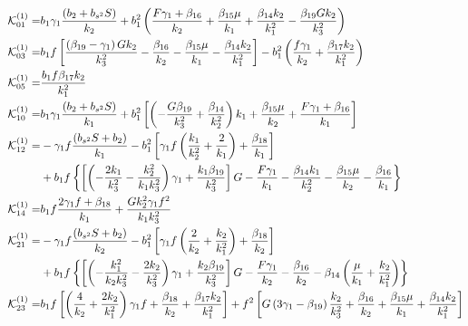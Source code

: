 \begin{align}
\ko^{(1)}_{01}=&
 b_{1}\gamma_{1}\frac{\left( b_{2}+b_{s^2} S \right)}{k_{2}}
+ b_{1}^{2}
\left(\frac{F \gamma_{1}+\beta_{16}}{k_{2}}+\frac{\beta_{15} \mu}{k_{1}}+\frac{\beta_{14}k_{2} }{k_{1}^{2}}-\frac{  \beta_{19}G k_{2}}{k_{3}^{2}}\right)
%
 \\ \ko^{(1)}_{03}=& b_{1}f\left[\frac{\left(\beta_{19}-\gamma_{1}\right) G k_{2}}{k_{3}^{2}}-\frac{\beta_{16}}{k_{2}}-\frac{\beta_{15} \mu}{k_{1}}-\frac{\beta_{14} k_{2} }{k_{1}^{2}}\right] 
 -b_{1}^{2}\left(\frac{f \gamma_{1}}{k_{2}}+\frac{ \beta_{17}k_{2}}{k_{1}^{2}}\right) 
 \\ \ko^{(1)}_{05}=&  \frac{b_{1}f \beta_{17}k_{2} }{k_{1}^{2}}
 \\ \ko^{(1)}_{10}=& b_{1}\gamma_{1}\frac{\left(b_{2}+b_{s^2} S \right)}{k_{1}}+  b_{1}^{2}\left[\left(-\frac{G \beta_{19}}{k_{3}^{2}}+\frac{\beta_{14}}{k_{2}^{2}}\right) k_{1}+\frac{\beta_{15} \mu}{k_{2}}+\frac{F \gamma_{1}+\beta_{16}}{k_{1}}\right]
 \\ \ko^{(1)}_{12}=&  - \gamma_{1} f\frac{\left(b_{s^2} S+b_{2}\right)}{k_{1}}-  b_{1}^{2}\left[\gamma_{1} f\left(\frac{k_{1}}{k_{2}^{2}}+\frac{2}{k_{1}}\right) +\frac{\beta_{18}}{k_{1}}\right]\\&
 + b_{1}f\left\{\left[\left(-\frac{2 k_{1}}{k_{3}^{2}}-\frac{k_{2}^{2}}{k_{1} k_{3}^{2}}\right) \gamma_{1}+\frac{k_{1} \beta_{19}}{k_{3}^{2}}\right] G-\frac{F \gamma_{1}}{k_{1}}-\frac{\beta_{14} k_{1}}{k_{2}^{2}}-\frac{\beta_{15} \mu}{k_{2}}-\frac{\beta_{16}}{k_{1}}\right\}
 \\ \ko^{(1)}_{14}=&  b_{1}f\frac{2 \gamma_{1} f+\beta_{18}}{k_{1}}+\frac{G k_{2}^{2} \gamma_{1} f^{2}}{k_{1} k_{3}^{2}}
 \\ \ko^{(1)}_{21}=& -\gamma_{1} f\frac{\left(b_{s^2} S+ b_{2}\right)}{k_{2}}
  -b_{1}^{2}\left[\gamma_1 f\left(\frac{2}{k_{2}}+\frac{k_{2}}{k_{1}^{2}}\right) +\frac{\beta_{18}}{k_{2}}\right] \\
 &+b_1f\left\{\left[\left(-\frac{k_{1}^{2}}{k_{2} k_{3}^{2}}-\frac{2 k_{2}}{k_{3}^{2}}\right) \gamma_{1}+\frac{k_{2} \beta_{19}}{k_{3}^{2}}\right] G-\frac{F \gamma_{1}}{k_{2}}-\frac{\beta_{16}}{k_{2}}-\beta_{14}\left(\frac{ \mu}{k_{1}}+\frac{k_{2} }{k_{1}^{2}}\right)\right\}
 \\ \ko^{(1)}_{23}=&  b_{1}f\left[\left(\frac{4}{k_{2}}+\frac{2 k_{2}}{k_{1}^{2}}\right) \gamma_{1} f+\frac{\beta_{18}}{k_{2}}+\frac{\beta_{17} k_{2} }{k_{1}^{2}} \right]+f^{2}\left[G\left(3 \gamma_{1}-\beta_{19}\right) \frac{k_{2} }{k_{3}^{2}}+\frac{\beta_{16}}{k_{2}}+\frac{\beta_{15} \mu}{k_{1}}+\frac{\beta_{14} k_{2} }{k_{1}^{2}}\right]

\end{align}

